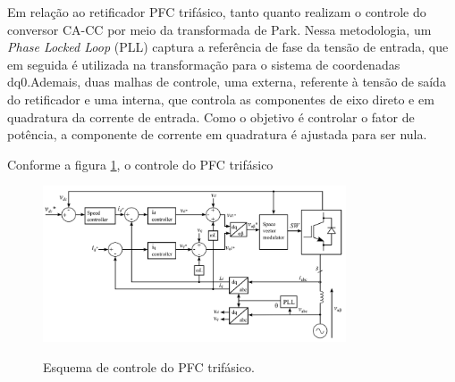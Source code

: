 Em relação ao retificador PFC trifásico, tanto \cite{3phPlecs} quanto \cite{WANG2013/03}
realizam o controle do conversor CA-CC por meio da transformada de Park. Nessa metodologia, um
\textit{Phase Locked Loop} (PLL) captura a referência de fase da tensão de entrada, que em
seguida é utilizada na transformação para o sistema de coordenadas dq0.Ademais, duas malhas de
controle, uma externa, referente à tensão de saída do retificador e uma interna, que controla
as componentes de eixo direto e em quadratura da corrente de entrada. Como o objetivo é
controlar o fator de potência, a componente de corrente em quadratura é ajustada para ser nula.

Conforme a figura \ref{fig:controlepfc3ph}, o controle do PFC trifásico

\begin{figure}
	\centering
	\caption{Esquema de controle do PFC trifásico.}
	\includegraphics[width=0.8\textwidth]{./Figuras/controlepfc3ph.png}
	\label{fig:controlepfc3ph}
\end{figure}